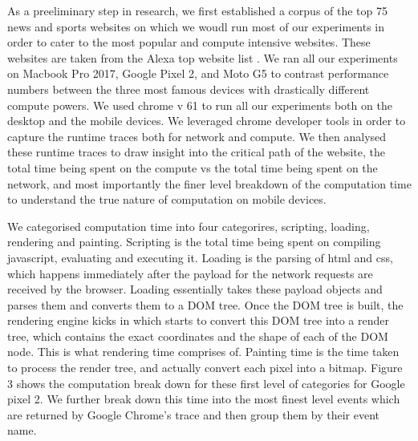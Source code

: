 As a preeliminary step in research, we first established a corpus of
the top 75 news and sports websites on which we woudl run most of our
experiments in order to cater to the most popular and compute
intensive websites.  These websites are taken from the Alexa top
website list \cite{}.  We ran all our experiments on Macbook Pro 2017,
Google Pixel 2, and Moto G5 to contrast performance numbers between
the three most famous devices with drastically different compute
powers. We used chrome v 61 to run all  our experiments both on the
desktop and the mobile devices. We leveraged chrome developer tools in
order to capture the runtime traces both for network and compute. We
then analysed these runtime traces to draw insight into the critical
path of the website, the total time being spent on the compute vs the
total time being spent on the network, and most importantly the finer
level breakdown of the computation time to understand the true nature
of computation on mobile devices. 

We categorised computation time into four categorires, scripting,
loading, rendering and painting. Scripting is the total time being
spent on compiling javascript, evaluating and executing it. Loading is
the parsing of html and css, which happens immediately after the
payload for the network requests are received by the browser. Loading
essentially takes these payload objects and parses them and converts
them to a DOM tree. Once the DOM tree is built, the rendering engine
kicks in which starts to convert this DOM tree into a render tree,
which contains the exact coordinates and the shape of each of the DOM
node. This is what rendering time comprises of.  Painting time is the
time taken to process the render tree, and actually convert each pixel
into a bitmap.  Figure 3 shows the computation break down for these
first level of categories for Google pixel 2. We further break down
this time into the most finest level events which are returned by
Google Chrome's trace and then group them by their event name.

